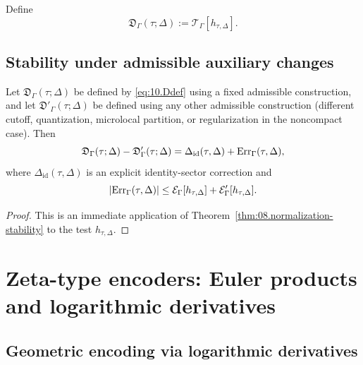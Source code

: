 \begin{definition}\label{def:10.Ddef}
Define
\begin{equation}\label{eq:10.Ddef}
\mathfrak D_\Gamma(\tau;\Delta):=\mathcal T_\Gamma[h_{\tau,\Delta}].
\end{equation}
\end{definition}

\subsection{Stability under admissible auxiliary changes}
\label{subsec:10.osc.stability}

\begin{proposition}\label{prop:10.D.stability}
Let $\mathfrak D_\Gamma(\tau;\Delta)$ be defined by \eqref{eq:10.Ddef} using a fixed admissible construction, and let
$\mathfrak D'_\Gamma(\tau;\Delta)$ be defined using any other admissible construction (different cutoff, quantization,
microlocal partition, or regularization in the noncompact case). Then
\begin{equation}\label{eq:10.D.stability}
\mathfrak D_\Gamma(\tau;\Delta)-\mathfrak D'_\Gamma(\tau;\Delta)
=
\Delta_{\mathrm{id}}(\tau,\Delta)
+
\mathrm{Err}_\Gamma(\tau,\Delta),
\end{equation}
where $\Delta_{\mathrm{id}}(\tau,\Delta)$ is an explicit identity-sector correction and
\begin{equation}\label{eq:10.D.stability.bound}
|\mathrm{Err}_\Gamma(\tau,\Delta)|
\le
\mathcal E_\Gamma[h_{\tau,\Delta}]+\mathcal E'_\Gamma[h_{\tau,\Delta}].
\end{equation}
\end{proposition}

\begin{proof}
This is an immediate application of Theorem~\ref{thm:08.normalization-stability} to the test $h_{\tau,\Delta}$.
\end{proof}

\section{Zeta-type encoders: Euler products and logarithmic derivatives}
\label{sec:10.zeta-encoders}

\subsection{Geometric encoding via logarithmic derivatives}
\label{subsec:10.euler}

